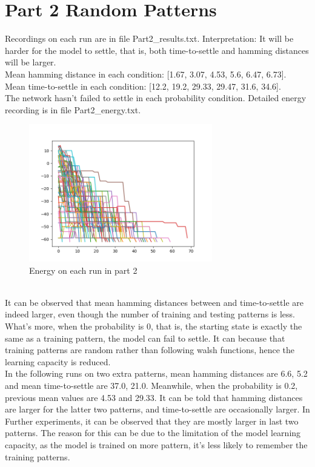 \documentclass{article}
\begin{document}
\section*{Part 2 Random Patterns}
Recordings on each run are in file Part2\_results.txt. Interpretation: It will be harder for the model to settle, that is, both time-to-settle and hamming distances will be larger.\\
Mean hamming distance in each condition: [1.67, 3.07, 4.53, 5.6, 6.47, 6.73].\\
Mean time-to-settle in each condition: [12.2, 19.2, 29.33, 29.47, 31.6, 34.6].\\
The network hasn't failed to settle in each probability condition. Detailed energy recording is in file Part2\_energy.txt.\\
\begin{figure}[h]
    \centering
    \includegraphics[width=8cm]{Part2energy}
    \caption{Energy on each run in part 2}
\end{figure}\\
It can be observed that mean hamming distances between and time-to-settle are indeed larger, even though the number of training and testing patterns is less. What's more, when the probability is 0, that is, the starting state is exactly the same as a training pattern, the model can fail to settle. It can because that training patterns are random rather than following walsh functions, hence the learning capacity is reduced.\\
In the following runs on two extra patterns, mean hamming distances are 6.6, 5.2 and mean time-to-settle are 37.0, 21.0. Meanwhile, when the probability is 0.2, previous mean values are 4.53 and 29.33. It can be told that hamming distances are larger for the latter two patterns, and time-to-settle are occasionally larger. In Further experiments, it can be observed that they are mostly larger in last two patterns.
The reason for this can be due to the limitation of the model learning capacity, as the model is trained on more pattern, it's less likely to remember the training patterns.
\newpage
\end{document}
